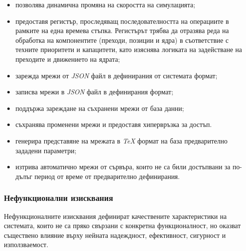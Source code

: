 \begin{itemize}[itemsep=0.5em, topsep=0pt]
	\item позволява динамична промяна на скоростта на симулацията;
	
	\item предоставя регистър, проследяващ последователността на операциите в рамките на една времева стъпка. Регистърът трябва да отразява реда на обработка на компонентите (преходи, позиции и ядра) в съответствие с техните приоритети и капацитети, като изяснява логиката на задействане на преходите и движението на ядрата;
	
	\item зарежда мрежи от \textit{JSON} файл в дефинирания от системата формат;
	
	\item записва мрежи в \textit{JSON} файл в дефинирания формат;
	
	\item поддържа зареждане на съхранени мрежи от база данни;
	
	\item съхранява променени мрежи и предоставя хипервръзка за достъп.
	
	\item генерира представяне на мрежата в \textit{TeX} формат на база предварително зададени параметри;
	
	\item изтрива автоматично мрежи от сървъра, които не са били достъпвани за по-дълъг период от време от предварително дефинирания.
\end{itemize}

\vspace{0.25cm}

\subsubsection{Нефункционални изисквания}
\label{sec:non-functional-requirements}
\hspace*{2.5em}Нефункционалните изисквания дефинират качествените характеристики на системата, които не са пряко свързани с конкретна функционалност, но оказват съществено влияние върху нейната надеждност, ефективност, сигурност и използваемост.

